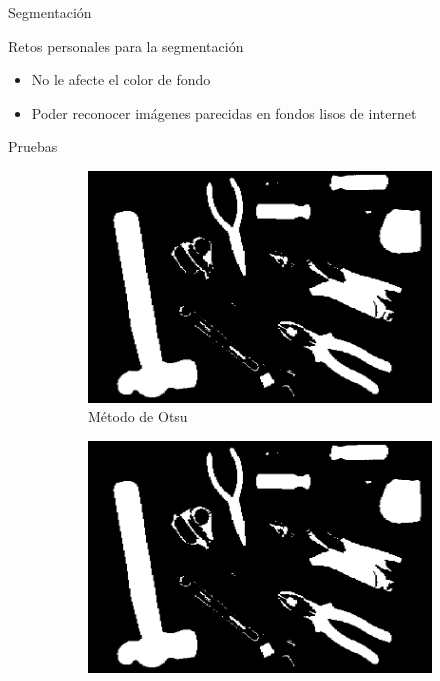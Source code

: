 \documentclass[
  24pt, %
]{beamer}
\begin{document}
\begin{frame}{Segmentación}

  Retos personales para la segmentación
  \bigskip %
  \begin{itemize}
  \item<1-> No le afecte el color de fondo
    \bigskip %
  \item<2-> Poder reconocer imágenes parecidas en fondos lisos de internet
  \end{itemize}
  
\end{frame}

\begin{frame}{Pruebas}

  \begin{figure}[h]
  \centering
  \begin{subfigure}{0.4\linewidth}
    \includegraphics[width=\linewidth]{otsu} 
    \caption{Método de Otsu}
  \end{subfigure}
  \begin{subfigure}{0.4\linewidth}
    \includegraphics[width=\linewidth]{kmeans2}

\end{subfigure}
\end{figure}
\end{frame}
\end{document}
